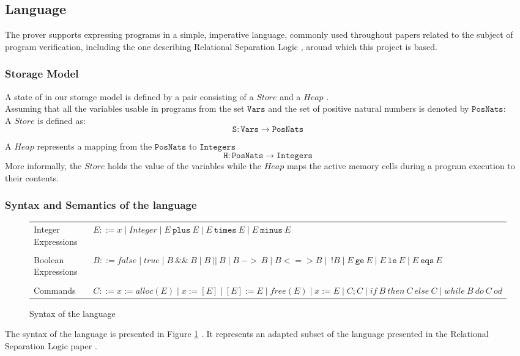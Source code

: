 \documentclass[12pt,a4paper]{article}
\begin{document}
\subsection{Language}
The prover supports expressing programs in a simple, imperative language, commonly used throughout papers \cite{SeparationLogic} \cite{primer} related to the subject of program verification, including the one describing Relational Separation Logic \cite{relational}, around  which this project is based. 
\subsubsection{Storage Model}
A state of in our storage model is defined by a pair consisting of a \(Store\) and a \(Heap\) .
\\
 Assuming that all the variables usable in programs from the set \(\mathtt{Vars}\) and the set of positive natural numbers is denoted by \(\mathtt{PosNats}\): \\
 
A \(Store\) is defined as:
\[ \mathtt{S} : \mathtt{Vars} \rightarrow \mathtt{PosNats} \]
 
A \(Heap\) represents a mapping from the \(\mathtt{PosNats}\) to \(\mathtt{Integers}\)
\[ \mathtt{H} : \mathtt{PosNats} \rightarrow \mathtt{Integers} \] 
More informally, the \(Store\) holds the value of the variables while the \(Heap\) maps the active memory cells during a program execution to their contents.
\subsubsection{Syntax and Semantics of the language}
\begin{figure}[h]
	\begin{tabularx}{\linewidth}{l  X}
	Integer Expressions& \(E ::= x \mid Integer \mid E\ \mathtt{plus}\ E \mid E\ \mathtt{times}\ E \mid E\ \mathtt{minus}\ E \) \\
	\\
	Boolean Expressions& \(B ::= false \mid true \mid B\ \mathtt{\&\&}\ B \mid  B\ ||\ B \mid B\  \mathtt{->}\ B \mid B \mathtt{<=>} B \mid \ ! B \mid E\ \mathtt{ge}\ E \mid E\ \mathtt{le}\ E \mid E\ \mathtt{eqs}\ E \)\\
	\\ 	
	Commands& \(C ::= x := alloc(E) \mid x := [E] \mid [E] := E \mid free(E) \mid x := E \mid C;C \mid if\ B\ then\ C\ else\ C \mid while\ B\ do\ C\ od \) \\
	\end{tabularx}
	\caption{Syntax of the language}
	\label{fig:langSyntax}
\end{figure}
The syntax of the language is presented in Figure \ref{fig:langSyntax} . It represents an adapted subset of the language presented in the Relational Separation Logic paper \cite{relational} . 
\end{document}
